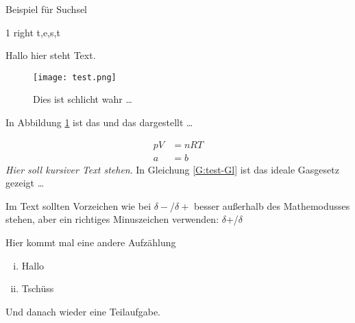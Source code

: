 \documentclass[./main.tex]{subfiles}
\begin{document}
\renewcommand{\tasktitle}{Allgemeine Chemie}
\renewcommand{\taskpoints}{3.5} %
\renewcommand{\taskweight}{8.7}
\aufgabenanfang
Beispiel für Suchsel
\begin{alphabetsoup}[10][10]
     {1} {right} {t,e,s,t}
\end{alphabetsoup}
\listofclues
Hallo hier steht Text. \par

\blindtext
{}

\blindtext

\blindtext

\begin{figure}[H]
    \centering
    \texttt{[image: test.png]}
    \caption{Dies ist schlicht wahr \ldots }
    \label{A:test-Abb}
\end{figure}

In Abbildung \ref{A:test-Abb} ist das und das dargestellt \ldots 

\begin{align}
    pV &= nRT \label{G:test-Gl}\\
    a &= b
\end{align}
\textit{Hier soll kursiver Text stehen}.
In Gleichung \ref{G:test-Gl} ist das ideale Gasgesetz gezeigt \ldots 

Im Text sollten Vorzeichen wie bei $\delta-$/$\delta+$ besser au\ss{}erhalb des Mathemodusses stehen, aber ein richtiges Minuszeichen verwenden: $\delta$+/$\delta$\textminus{}

Hier kommt mal eine andere Aufz\"ahlung
\begin{enumerate}[(i)]
    \item Hallo
    \item Tsch\"uss
\end{enumerate}
Und danach wieder eine Teilaufgabe.

\aufgabenende
\end{document}
